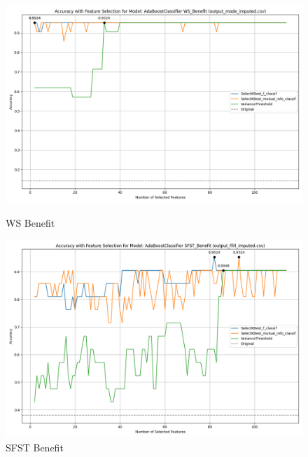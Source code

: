 \begin{figure}[H]
    \centering
    \begin{minipage}[b]{0.45\textwidth}
        \includegraphics[width=\textwidth]{class_all_section/images_class_ensemble_reduction/feature_selection_accuracy_plot_output_mode_imputedcsv_AdaBoostClassifier_WS_Benefit.png}
        \caption{WS Benefit}
        \label{fig_class_all:ws_ben_featred_graph}
    \end{minipage}
    \hfill
    \begin{minipage}[b]{0.45\textwidth}
        \includegraphics[width=\textwidth]{class_all_section/images_class_ensemble_reduction/feature_selection_accuracy_plot_output_ffill_imputedcsv_AdaBoostClassifier_SFST_Benefit.png}
        \caption{SFST Benefit}
        \label{fig_class_all:sfst_ben_featred_graph}
    \end{minipage}
\end{figure}
